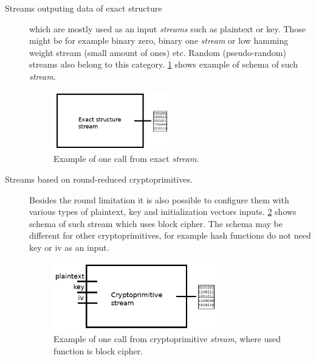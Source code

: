 \documentclass[
    digital,    %
    oneside,    %
    color,
    11pt,
    nocover,
    notable,
    nolof,
    nolot,
    final
]{fithesis3}
\begin{document}
\begin{description}
	\item[Streams outputing data of exact structure] which are mostly used as an input \textit{streams} such as plaintext or key. Those might be for example binary zero, binary one \textit{stream} or low hamming weight stream (small amount of ones) etc. Random (pseudo-random) streams also belong to this category. \cref{fig:exact-stream} shows example of schema of such \textit{stream}.
	
	\begin{figure}[h]
		\centering
		\includegraphics[width=0.5\textwidth]{./images/pictures/exact-stream.png}
		\caption{Example of one call from exact \textit{stream}.}
		\label{fig:exact-stream}
	\end{figure}
	
	\item[Streams based on round-reduced cryptoprimitives.] Besides the round limitation it is also possible to configure them with various types of plaintext, key and initialization vectors inputs. \cref{fig:crypto-stream} shows schema of such stream which uses block cipher. The schema may be different for other cryptoprimitives, for example hash functions do not need key or iv as an input.
	
	\begin{figure}[h]
		\centering
		\includegraphics[width=0.7\textwidth]{./images/pictures/cryptoprimitive-stream.png}
		\caption{Example of one call from cryptoprimitive \textit{stream}, where used function is block cipher.}
		\label{fig:crypto-stream}
	\end{figure}
	

\end{description}
\end{document}
